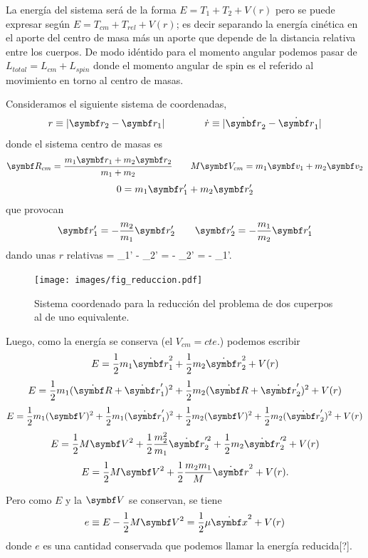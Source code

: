 \documentclass[10pt,oneside]{CBFT_book}
\begin{document}
La energía del sistema será de la forma  $ E = T_1 + T_2 + V(r) $ pero se puede expresar según 
$ E = T_{cm} + T_{rel} + V(r) $; es decir separando la energía cinética en el aporte del centro de
masa más un aporte que depende de la distancia relativa entre los cuerpos.
De modo idéntido para el momento angular podemos pasar de $ L_{total} = L_{cm} + L_{spin} $ donde el
momento angular de spin es el referido al movimiento en torno al centro de masas.

Consideramos el siguiente sistema de coordenadas,
\[
	r \equiv | \vb{r}_2 - \vb{r}_1 | \qquad	\qquad  \dot{r} \equiv | \dot{\vb{r}}_2 - \dot{\vb{r}}_1 |
\]
donde el sistema centro de masas es
\[
	\vb{R}_{cm} = \frac{ m_1\vb{r}_1 + m_2\vb{r}_2 }{ m_1 + m_2 }	\qquad 
	M \vb{V}_{cm} =  m_1\vb{v}_1 + m_2\vb{v}_2 
\]
\[
	0 = m_1\vb{r}_1' + m_2\vb{r}_2'
\]
que provocan
\[
	\vb{r}_1' = -\frac{m_2}{m_1}\vb{r}_2' \qquad   \vb{r}_2' = -\frac{m_1}{m_2}\vb{r}_1' 
\]
dando unas $r$ relativas
\be
	 = _1' - _2' = - _2' = - _1'.
	\label{r_relativas}
\ee

\begin{figure}[hbt]
	\begin{center}
	\texttt{[image: images/fig\_reduccion.pdf]}	 
	\end{center}
	\caption{Sistema coordenado para la reducción del problema de dos cuperpos al de uno equivalente.}
\end{figure} 

Luego, como la energía se conserva (el $V_{cm}=cte.$) podemos escribir
\[
	E = \frac{1}{2} m_1 \dot{\vb{r}}_1^2 + \frac{1}{2} m_2 \dot{\vb{r}}_2^2 + V(r)
\]
\[
	E = \frac{1}{2} m_1 ( \dot{\vb{R}} + \dot{\vb{r}}_1' )^2 + \frac{1}{2} m_2 ( \dot{\vb{R}} + \dot{\vb{r}}_2' )^2 
+ V(r)
\]
\[
	E = \frac{1}{2} m_1 ( {\vb{V}} )^2 +  \frac{1}{2} m_1 ( \dot{\vb{r}}_1' )^2 + 
		\frac{1}{2} m_2 ( {\vb{V}})^2 + \frac{1}{2} m_2 (\dot{\vb{r}}_2' )^2 + V(r)
\]
\[
	E = \frac{1}{2} M {\vb{V}}^2 + \frac{1}{2} \frac{m_2^2}{m_1} \dot{\vb{r}}_2'^2 + \frac{1}{2} m_2 
\dot{\vb{r}}_2'^2 + V(r)
\]
\[
	E = \frac{1}{2} M {\vb{V}}^2 + \frac{1}{2} \frac{m_2 m_1}{M} \dot{\vb{r}}^2 + V(r).
\]

Pero como $E$ y la $\vb{V}$ se conservan, se tiene 
\[
	e \equiv E - \frac{1}{2} M {\vb{V}}^2 =  \frac{1}{2} \mu \dot{\vb{x}}^2 + V(r)
\]
donde $e$ es una cantidad conservada que podemos llamar la energía reducida[?].
\end{document}

